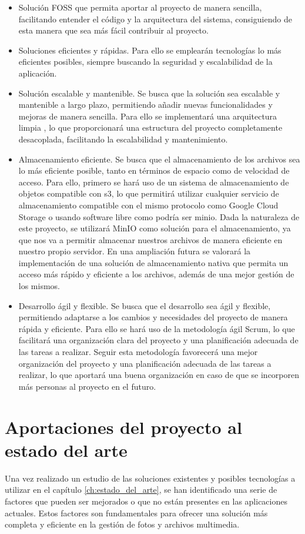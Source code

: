 \begin{itemize}
    \item Solución FOSS que permita aportar al proyecto de manera sencilla, facilitando entender el código y la arquitectura del sistema, consiguiendo de esta manera que sea más fácil contribuir al proyecto.
    \item Soluciones eficientes y rápidas. Para ello se emplearán tecnologías lo más eficientes posibles, siempre buscando la seguridad y escalabilidad de la aplicación.
    \item Solución escalable y mantenible. Se busca que la solución sea escalable y mantenible a largo plazo, permitiendo añadir nuevas funcionalidades y mejoras de manera sencilla. Para ello se implementará una arquitectura limpia \parencite{uncle-bob-clean-architecture}, lo que proporcionará una estructura del proyecto completamente desacoplada, facilitando la escalabilidad y mantenimiento.
    \item Almacenamiento eficiente. Se busca que el almacenamiento de los archivos sea lo más eficiente posible, tanto en términos de espacio como de velocidad de acceso.
        Para ello, primero se hará uso de un sistema de almacenamiento de objetos compatible con \gls{s3}, lo que permitirá utilizar cualquier servicio de almacenamiento compatible con el mismo protocolo como Google Cloud Storage o usando software libre como podría ser \gls{minio}.
        Dada la naturaleza de este proyecto, se utilizará MinIO como solución para el almacenamiento, ya que nos va a permitir almacenar nuestros archivos de manera eficiente en nuestro propio servidor.
        En una ampliación futura se valorará la implementación de una solución de almacenamiento nativa que permita un acceso más rápido y eficiente a los archivos, además de una mejor gestión de los mismos.
    \item Desarrollo ágil y flexible. Se busca que el desarrollo sea ágil y flexible, permitiendo adaptarse a los cambios y necesidades del proyecto de manera rápida y eficiente. Para ello se hará uso de la metodología ágil Scrum, lo que facilitará una organización clara del proyecto y una planificación adecuada de las tareas a realizar.
        Seguir esta metodología favorecerá una mejor organización del proyecto y una planificación adecuada de las tareas a realizar, lo que aportará una buena organización en caso de que se incorporen más personas al proyecto en el futuro.
\end{itemize}

\section{Aportaciones del proyecto al estado del arte}
Una vez realizado un estudio de las soluciones existentes y posibles tecnologías a utilizar en el capítulo \ref{ch:estado_del_arte}, se han identificado una serie de factores que pueden ser mejorados o que no están presentes en las aplicaciones actuales. Estos factores son fundamentales para ofrecer una solución más completa y eficiente en la gestión de fotos y archivos multimedia.

